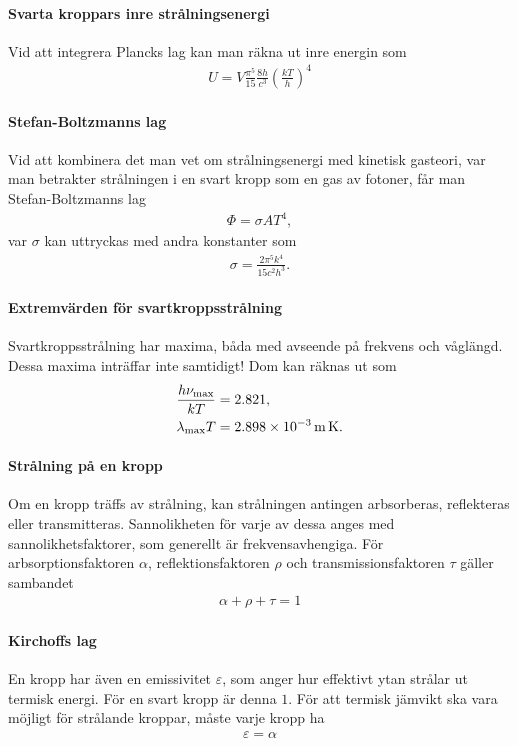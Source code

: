 \paragraph{Svarta kroppars inre strålningsenergi}
Vid att integrera Plancks lag kan man räkna ut inre energin som
\begin{align*}
	U = V\frac{\pi^5}{15}\frac{8h}{c^3}\left(\frac{kT}{h}\right)^4
\end{align*}

\paragraph{Stefan-Boltzmanns lag}
Vid att kombinera det man vet om strålningsenergi med kinetisk gasteori, var man betrakter strålningen i en svart kropp som en gas av fotoner, får man Stefan-Boltzmanns lag
\begin{align*}
	\Phi = \sigma AT^4,
\end{align*}
var $\sigma$ kan uttryckas med andra konstanter som
\begin{align*}
	\sigma = \frac{2\pi^5 k^4}{15c^2 h^3}.
\end{align*}

\paragraph{Extremvärden för svartkroppsstrålning}
Svartkroppsstrålning har maxima, båda med avseende på frekvens och våglängd. Dessa maxima inträffar inte samtidigt! Dom kan räknas ut som
\begin{align*}
	& \frac{h\nu_\text{max}}{kT} = 2.821, \\
	& \lambda_\text{max}T = \SI{2.898E-3}{\meter~\kelvin}.
\end{align*}

\paragraph{Strålning på en kropp}
Om en kropp träffs av strålning, kan strålningen antingen arbsorberas, reflekteras eller transmitteras. Sannolikheten för varje av dessa anges med sannolikhetsfaktorer, som generellt är frekvensavhengiga. För arbsorptionsfaktoren $\alpha$, reflektionsfaktoren $\rho$ och transmissionsfaktoren $\tau$ gäller sambandet
\begin{align*}
	\alpha + \rho + \tau = 1
\end{align*}

\paragraph{Kirchoffs lag}
En kropp har även en emissivitet $\varepsilon$, som anger hur effektivt ytan strålar ut termisk energi. För en svart kropp är denna $1$. För att termisk jämvikt ska vara möjligt för strålande kroppar, måste varje kropp ha
\begin{align*}
	\varepsilon = \alpha
\end{align*}